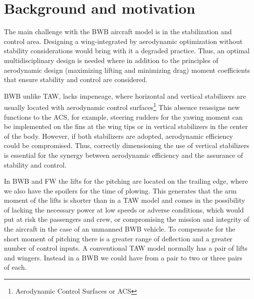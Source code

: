 
\section{Background and motivation}

The main challenge with the BWB aircraft model is in the stabilization and control area. Designing a wing-integrated by aerodynamic optimization without stability considerations would bring with it a degraded practice. Thus, an optimal multidisciplinary design is needed where in addition to the principles of aerodynamic design (maximizing lifting and minimizing drag) moment coefficients that ensure stability and control are considered. 

BWB unlike TAW, lacks impeneage, where horizontal and vertical stabilizers are usually located with aerodynamic control surfaces\footnote{Aerodynamic Control Surfaces or ACS} This absence reassigns new functions to the ACS, for example, steering rudders for the yawing moment can be implemented on the fins at the wing tips or in vertical stabilizers in the center of the body. However, if both stabilizers are adopted, aerodynamic efficiency could be compromised. Thus, correctly dimensioning the use of vertical stabilizers is essential for the synergy between aerodynamic efficiency and the assurance of stability and control.

In BWB and FW the lifts for the pitching are located on the trailing edge, where we also have the spoilers for the time of plowing. This generates that the arm moment of the lifts is shorter than in a TAW model and comes in the possibility of lacking the necessary power at low speeds or adverse conditions, which would put at risk the passengers and crew, or compromising the mission and integrity of the aircraft in the case of an unmanned BWB vehicle. To compensate for the short moment of pitching there is a greater range of deflection and a greater number of control inputs. A conventional TAW model normally has a pair of lifts and wingers. Instead in a BWB we could have from a pair to two or three pairs of each.
 
